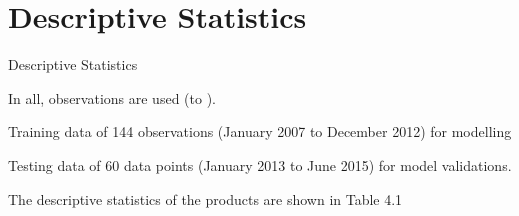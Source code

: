 \documentclass{beamer}
\begin{document}
	\section{Descriptive Statistics}
	\label{sec:Descriptive}
	\begin{frame}{Descriptive Statistics}
		\begin{block}{}
			\vspace{4pt}
			In all, \numOfObservations observations are used (\startDate to \finishDate). \vspace{4pt}
		\end{block} \vspace{5pt}
		
		\begin{block}{}
		Training data of 144 observations (January 2007 to December 2012) for modelling \\ \vspace{5pt}
		
		Testing data of 60 data points (January 2013 to June 2015) for model validations.
		\end{block} \vspace{5pt}
	
		\begin{block}{}
			The descriptive statistics of the products are shown in Table 4.1
		\end{block}
	\end{frame}
	
	
	
	
	
	
	
	
	
	
	
	
	
	
	
	
	
	
	
	
	
	
	
	
\end{document}
